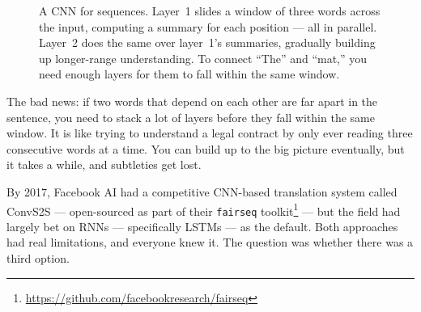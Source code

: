 \begin{figure}[htb]
\caption{A CNN for sequences. Layer~1 slides a window of three words across the input, computing a summary for each position --- all in parallel. Layer~2 does the same over layer~1's summaries, gradually building up longer-range understanding. To connect ``The'' and ``mat,'' you need enough layers for them to fall within the same window.}
\end{figure}

The bad news: if two words that depend on each other are far apart in the sentence, you need to stack a lot of layers before they fall within the same window.
It is like trying to understand a legal contract by only ever reading three consecutive words at a time.
You can build up to the big picture eventually, but it takes a while, and subtleties get lost.

By 2017, Facebook AI had a competitive CNN-based translation system called ConvS2S \cite{gehring2017convs2s} --- open-sourced as part of their \texttt{fairseq} toolkit\footnote{\url{https://github.com/facebookresearch/fairseq}} --- but the field had largely bet on RNNs --- specifically LSTMs --- as the default.
Both approaches had real limitations, and everyone knew it.
The question was whether there was a third option.
